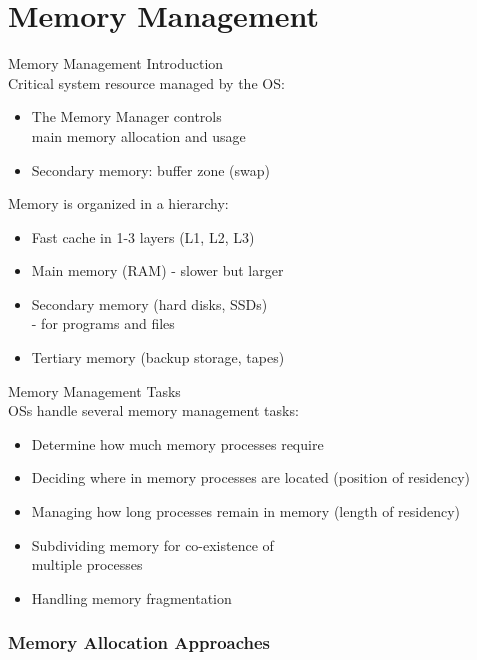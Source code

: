\section{Memory Management}


\begin{definition}{Memory Management Introduction}\\
    Critical system resource managed by the OS:
    \begin{itemize}
        \item The Memory Manager controls \\ main memory allocation and usage
        \item Secondary memory: buffer zone (swap)
    \end{itemize}
    
    Memory is organized in a hierarchy:
    \begin{itemize}
        \item Fast cache in 1-3 layers (L1, L2, L3)
        \item Main memory (RAM) - slower but larger
        \item Secondary memory (hard disks, SSDs) \\ - for programs and files
        \item Tertiary memory (backup storage, tapes)
    \end{itemize}
\end{definition}

\begin{concept}{Memory Management Tasks}\\
    OSs handle several memory management tasks:
    \begin{itemize}
        \item Determine how much memory processes require
        \item Deciding where in memory processes are located (position of residency)
        \item Managing how long processes remain in memory (length of residency)
        \item Subdividing memory for co-existence of \\ multiple processes
        \item Handling memory fragmentation
    \end{itemize}
\end{concept}

\multend

\subsubsection{Memory Allocation Approaches}

